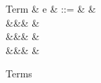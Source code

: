 \begin{figure}[H]
\begin{syntaxfig}
\mbox{Term}
&
e
&
::=
&
&
\\
&&&
&
\\
&&&
\exNil
&
\\
&&&
&
\end{syntaxfig}
\caption{Terms}
\end{figure}

